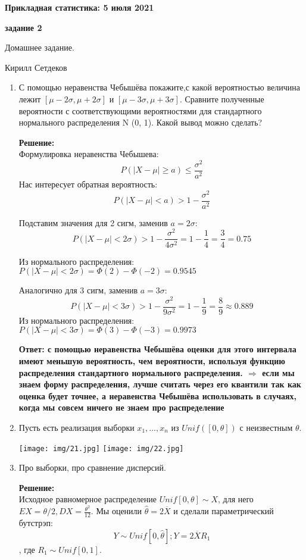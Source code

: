 \documentclass[a4paper,12pt]{article}
\renewcommand{\leq}{\leqslant}
\renewcommand{\geq}{\geqslant}
\newcounter{z}
\renewcommand{\date}{{\bf 5 июля 2021}}
\newcommand{\HSEhat}{
\vspace*{-0pt}
\noindent
\setcounter{z}{0}


{\bf \phantom{\date}  \large \hfill Прикладная статистика: \hfill \normalsize \date}

\vspace{5 pt}
{\bf \large \hfill  задание 2\hfill }

\vspace{15 pt}
\centerline{ \large  Домашнее задание.}
\centerline{ \large  Кирилл Сетдеков}



\vspace*{10pt}
\setcounter{z}{0}

}
\begin{document}
\HSEhat


\begin{enumerate}

\subsection*{Задачи:}

\item С помощью неравенства Чебышёва покажите,с какой вероятностью величина лежит $[\mu - 2 \sigma, \mu + 2 \sigma]$ и  $[\mu -3 \sigma, \mu +3 \sigma]$.
Сравните полученные вероятности с соответствующими вероятностями для стандартного нормального распределения N (0, 1). Какой вывод можно сделать?

\textbf{Решение:}\\
Формулировка неравенства Чебышева:
$$P(|X-\mu| \geq a) \leq \frac{\sigma ^2 }{a^2}$$
Нас интересует обратная вероятность:
$$P(|X-\mu| < a) > 1- \frac{\sigma ^2 }{a^2}$$

Подставим значения для 2 сигм, заменив $a = 2 \sigma$:
$$P(|X-\mu| < 2 \sigma) > 1 - \frac{\sigma ^2 }{4 \sigma^2} = 1-\frac{1}{4} = \frac{3}{4}=0.75$$

Из нормального распределения: $P(|X-\mu| < 2 \sigma) = \Phi(2) - \Phi(-2) = 0.9545$

Аналогично для 3 сигм, заменив $a = 3 \sigma$:
$$P(|X-\mu| < 3 \sigma) > 1 - \frac{\sigma ^2 }{9 \sigma^2} = 1-\frac{1}{9} = \frac{8}{9} \approx 0.889$$
Из нормального распределения: $P(|X-\mu| < 3 \sigma) = \Phi(3) - \Phi(-3) = 0.9973$

\textbf{Ответ: с помощью неравенства Чебышёва оценки для этого интервала имеют меньшую вероятность, чем вероятности, используя функцию распределения стандартного нормального распределения. $\Rightarrow$ если мы знаем форму распределения, лучше считать через его квантили так как оценка будет точнее, а неравенства Чебышёва использовать в случаях, когда мы совсем ничего не знаем про распределение} 

\item Пусть есть реализация выборки $x_1, ... , x_n$ из $Unif([0,\theta])$ с неизвестным $\theta$.

\texttt{[image: img/21.jpg]}
\texttt{[image: img/22.jpg]}

\item Про выборки, про сравнение дисперсий.


\textbf{Решение:}\\
Исходное равномерное распределение $Unif[0, \theta] \sim X$, для него $EX = \theta/2, DX = \frac{{\theta}^2}{12}$. Мы оценили $\hat{\theta} = 2\overline{X}$ и сделали параметрический бутстрэп:
$$Y\sim Unif[0, \hat{\theta}]; Y = 2\overline{X}R_1 $$, где $R_1 \sim Unif[0, 1]$.


\end{enumerate}
\end{document}
